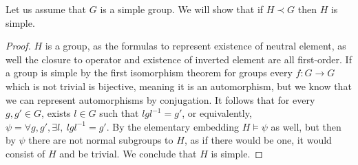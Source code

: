 \question{}
Let us assume that $G$ is a simple group.
We will show that if $H \prec G$ then $H$ is simple.
\begin{proof}
	$H$ is a group, as the formulas to represent existence of neutral element, as well the closure to operator and existence of inverted element are all first-order.
	If a group is simple by the first isomorphism theorem for groups every $f : G \to G$ which is not trivial is bijective, meaning it is an automorphism, but we know that we can represent automorphisms by conjugation.
	It follows that for every $g, g' \in G$, exists $l \in G$ such that $l g l^{-1} = g'$, or equivalently, $\psi = \forall g, g', \exists l,\ l g l^{-1} = g'$.
	By the elementary embedding $H \models \psi$ as well, but then by $\psi$ there are not normal subgroups to $H$, as if there would be one, it would consist of $H$ and be trivial.
	We conclude that $H$ is simple.
\end{proof}


